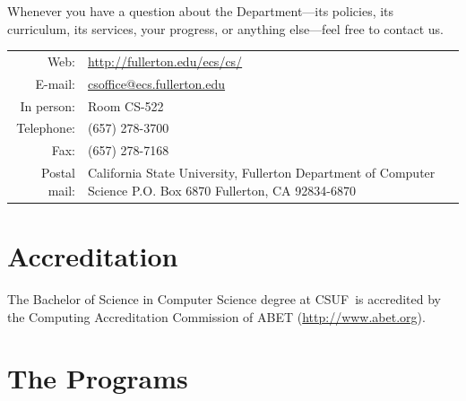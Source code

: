 \documentclass{book}
\newcommand{\CampusName}{CSUF}
\begin{document}
Whenever you have a question about the Department---its policies, its curriculum, its services, your progress, or anything else---feel free to contact us.

\begin{tabular}{r p{6in}} %
  Web: & \url{http://fullerton.edu/ecs/cs/} \\ \index{website}
  E-mail: & \href{mailto:csoffice@ecs.fullerton.edu}{csoffice@ecs.fullerton.edu} \\ \index{e-mail}
  In person: & Room CS-522 \\ \index{department office}
  Telephone: & (657) 278-3700 \\ \index{phone number} \index{telephone number}
  Fax: & (657) 278-7168 \\ \index{fax number}
  Postal mail: & California State University, Fullerton \newline\index{postal address}\index{address}Department of Computer Science \newline
P.O. Box 6870 \newline
Fullerton, CA 92834-6870
\end{tabular}

\section{Accreditation} 

The Bachelor of Science in Computer Science degree at \CampusName~is accredited by the Computing Accreditation Commission of ABET (\url{http://www.abet.org}).

\begin{center}
\end{center}

\section{The Programs}
\end{document}
